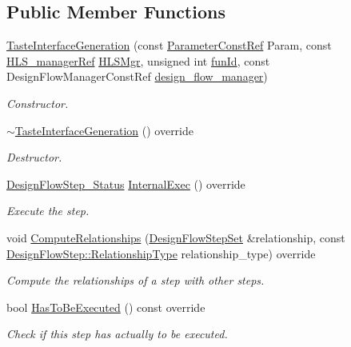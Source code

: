 \subsection*{Public Member Functions}
\begin{DoxyCompactItemize}
\item 
\hyperlink{classTasteInterfaceGeneration_a0da843c90610920daf5855c8f2fba111}{Taste\+Interface\+Generation} (const \hyperlink{Parameter_8hpp_a37841774a6fcb479b597fdf8955eb4ea}{Parameter\+Const\+Ref} Param, const \hyperlink{hls__manager_8hpp_acd3842b8589fe52c08fc0b2fcc813bfe}{H\+L\+S\+\_\+manager\+Ref} \hyperlink{classHLS__step_ade85003a99d34134418451ddc46a18e9}{H\+L\+S\+Mgr}, unsigned int \hyperlink{classHLSFunctionStep_a3e6434fd86c698b0c70520b859bff5b0}{fun\+Id}, const Design\+Flow\+Manager\+Const\+Ref \hyperlink{classDesignFlowStep_ab770677ddf087613add30024e16a5554}{design\+\_\+flow\+\_\+manager})
\begin{DoxyCompactList}\small\item\em Constructor. \end{DoxyCompactList}\item 
\hyperlink{classTasteInterfaceGeneration_a32597bb37a797ccd8b851f497bfd47b0}{$\sim$\+Taste\+Interface\+Generation} () override
\begin{DoxyCompactList}\small\item\em Destructor. \end{DoxyCompactList}\item 
\hyperlink{design__flow__step_8hpp_afb1f0d73069c26076b8d31dbc8ebecdf}{Design\+Flow\+Step\+\_\+\+Status} \hyperlink{classTasteInterfaceGeneration_ae0e9b26f9d75ef90566c8b22071c7cf9}{Internal\+Exec} () override
\begin{DoxyCompactList}\small\item\em Execute the step. \end{DoxyCompactList}\item 
void \hyperlink{classTasteInterfaceGeneration_aef8be37534a1f17bdfdb6c26ff565fac}{Compute\+Relationships} (\hyperlink{classDesignFlowStepSet}{Design\+Flow\+Step\+Set} \&relationship, const \hyperlink{classDesignFlowStep_a723a3baf19ff2ceb77bc13e099d0b1b7}{Design\+Flow\+Step\+::\+Relationship\+Type} relationship\+\_\+type) override
\begin{DoxyCompactList}\small\item\em Compute the relationships of a step with other steps. \end{DoxyCompactList}\item 
bool \hyperlink{classTasteInterfaceGeneration_a3cfa566432fc5a45a50ef491a4ba83f6}{Has\+To\+Be\+Executed} () const override
\begin{DoxyCompactList}\small\item\em Check if this step has actually to be executed. \end{DoxyCompactList}\end{DoxyCompactItemize}
